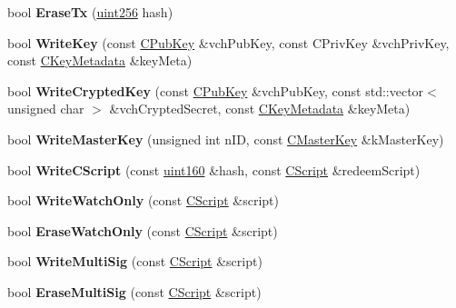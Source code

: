 \begin{DoxyCompactItemize}
bool {\bfseries Erase\+Tx} (\mbox{\hyperlink{classuint256}{uint256}} hash)
\item 
\mbox{\label{class_c_wallet_d_b_a7ebef5e0c7f604aa2159ba96d527e3a2}} 
bool {\bfseries Write\+Key} (const \mbox{\hyperlink{class_c_pub_key}{C\+Pub\+Key}} \&vch\+Pub\+Key, const C\+Priv\+Key \&vch\+Priv\+Key, const \mbox{\hyperlink{class_c_key_metadata}{C\+Key\+Metadata}} \&key\+Meta)
\item 
\mbox{\label{class_c_wallet_d_b_a914fb53d1731daf9b486f164dd325210}} 
bool {\bfseries Write\+Crypted\+Key} (const \mbox{\hyperlink{class_c_pub_key}{C\+Pub\+Key}} \&vch\+Pub\+Key, const std\+::vector$<$ unsigned char $>$ \&vch\+Crypted\+Secret, const \mbox{\hyperlink{class_c_key_metadata}{C\+Key\+Metadata}} \&key\+Meta)
\item 
\mbox{\label{class_c_wallet_d_b_a507690da431ef61244941ad39c308aeb}} 
bool {\bfseries Write\+Master\+Key} (unsigned int n\+ID, const \mbox{\hyperlink{class_c_master_key}{C\+Master\+Key}} \&k\+Master\+Key)
\item 
\mbox{\label{class_c_wallet_d_b_a8c69e48e2305775898658e0a4f4616c9}} 
bool {\bfseries Write\+C\+Script} (const \mbox{\hyperlink{classuint160}{uint160}} \&hash, const \mbox{\hyperlink{class_c_script}{C\+Script}} \&redeem\+Script)
\item 
\mbox{\label{class_c_wallet_d_b_a05e5a277f66010d12071a5d72cb4dfb0}} 
bool {\bfseries Write\+Watch\+Only} (const \mbox{\hyperlink{class_c_script}{C\+Script}} \&script)
\item 
\mbox{\label{class_c_wallet_d_b_ad6e63f550853905fcd67ec9e7c3bef8b}} 
bool {\bfseries Erase\+Watch\+Only} (const \mbox{\hyperlink{class_c_script}{C\+Script}} \&script)
\item 
\mbox{\label{class_c_wallet_d_b_a31a2e462a1a650c00216832db7c432ef}} 
bool {\bfseries Write\+Multi\+Sig} (const \mbox{\hyperlink{class_c_script}{C\+Script}} \&script)
\item 
\mbox{\label{class_c_wallet_d_b_a87baf4ce6ec8829649618706ba00b267}} 
bool {\bfseries Erase\+Multi\+Sig} (const \mbox{\hyperlink{class_c_script}{C\+Script}} \&script)

\end{DoxyCompactItemize}
